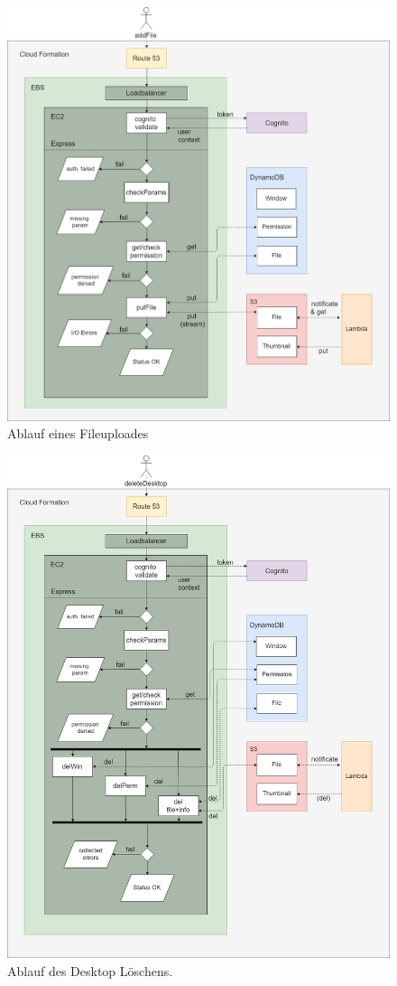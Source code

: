 \documentclass[a4paper, 12pt]{scrreprt}
\renewcommand\_{\textunderscore\allowbreak}
\begin{document}
\begin{figure}[H]
\centering
\includegraphics[scale=0.4]{AddFile-Szenario.png} 
\caption{Ablauf eines Fileuploades}
\end{figure}

\begin{figure}[H]
\centering
\includegraphics[scale=0.4]{DeleteWindow-Szenario.png}
\caption{Ablauf des Desktop Löschens.}
\end{figure}
\end{document}
